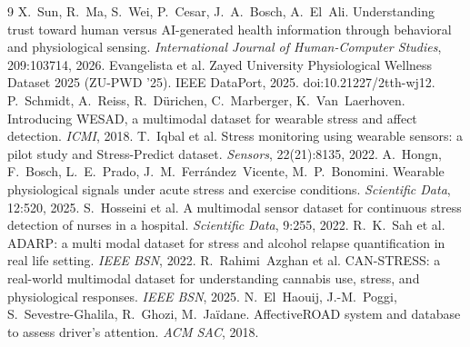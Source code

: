 \documentclass{article}
\begin{document}
{\footnotesize
\begin{thebibliography}{9}
\setlength{\itemsep}{0pt}
 X.~Sun, R.~Ma, S.~Wei, P.~Cesar, J.~A.~Bosch, A.~El~Ali. Understanding trust toward human versus AI-generated health information through behavioral and physiological sensing. \emph{International Journal of Human-Computer Studies}, 209:103714, 2026.
 Evangelista et al. Zayed University Physiological Wellness Dataset 2025 (ZU-PWD '25). IEEE DataPort, 2025. doi:10.21227/2tth-wj12.
 P.~Schmidt, A.~Reiss, R.~D\"urichen, C.~Marberger, K.~Van~Laerhoven. Introducing WESAD, a multimodal dataset for wearable stress and affect detection. \emph{ICMI}, 2018.
 T.~Iqbal et al. Stress monitoring using wearable sensors: a pilot study and Stress-Predict dataset. \emph{Sensors}, 22(21):8135, 2022.
 A.~Hongn, F.~Bosch, L.~E.~Prado, J.~M.~Ferr\'andez~Vicente, M.~P.~Bonomini. Wearable physiological signals under acute stress and exercise conditions. \emph{Scientific Data}, 12:520, 2025.
 S.~Hosseini et al. A multimodal sensor dataset for continuous stress detection of nurses in a hospital. \emph{Scientific Data}, 9:255, 2022.
 R.~K.~Sah et al. ADARP: a multi modal dataset for stress and alcohol relapse quantification in real life setting. \emph{IEEE BSN}, 2022.
 R.~Rahimi~Azghan et al. CAN-STRESS: a real-world multimodal dataset for understanding cannabis use, stress, and physiological responses. \emph{IEEE BSN}, 2025.
 N.~El~Haouij, J.-M.~Poggi, S.~Sevestre-Ghalila, R.~Ghozi, M.~Ja\"idane. AffectiveROAD system and database to assess driver's attention. \emph{ACM SAC}, 2018.
\end{thebibliography}
}
\end{document}
